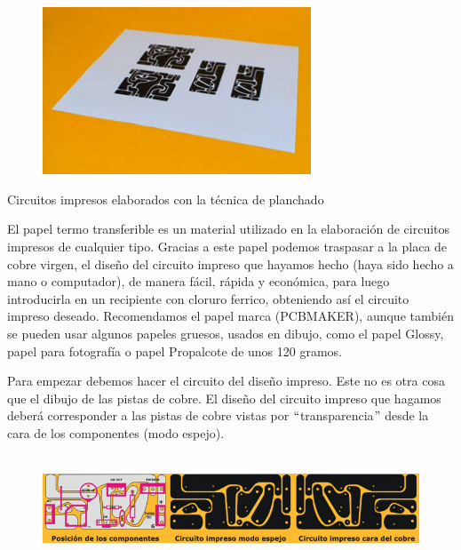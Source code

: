 \documentclass[12pt]{article}
\begin{document}

\begin{figure}[H]
	\begin{FlushLeft}		\includegraphics[width=3.15in,height=1.96in]{./media/image7.jpeg}
	\end{FlushLeft}\end{figure}



Circuitos impresos elaborados con la técnica de planchado\par

El papel termo transferible es un material utilizado en la elaboración de circuitos impresos de cualquier tipo. Gracias a este papel podemos traspasar a la placa de cobre virgen, el diseño del circuito impreso que hayamos hecho (haya sido hecho a mano o computador), de manera fácil, rápida y económica, para luego introducirla en un recipiente con cloruro ferrico, obteniendo así el circuito impreso deseado. Recomendamos el papel marca (PCBMAKER), aunque también se pueden usar algunos papeles gruesos, usados en dibujo, como el papel Glossy, papel para fotografía o papel Propalcote de unos 120 gramos.\par

Para empezar debemos hacer el circuito del diseño impreso. Este no es otra cosa que el dibujo de las pistas de cobre. El diseño del circuito impreso que hagamos deberá corresponder a las pistas de cobre vistas por $``$transparencia$"$  desde la cara de los componentes (modo espejo).\par




\begin{figure}[H]
	\begin{Center}
		\includegraphics[width=6.95in,height=1.26in]{./media/image8.jpeg}
	\end{Center}
\end{figure}
\end{document}
